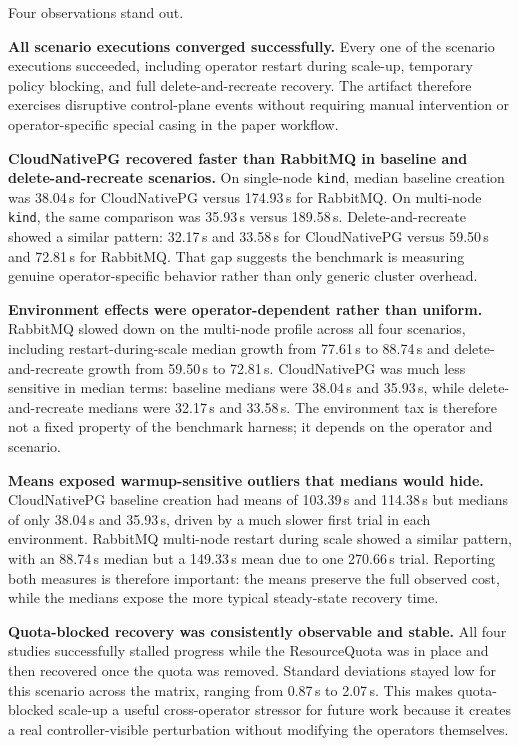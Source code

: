\documentclass[sigconf,screen]{acmart}
\begin{document}
Four observations stand out.

\textbf{All scenario executions converged successfully.}
Every one of the \RUPScenarioExecutions{} scenario executions succeeded,
including operator restart during scale-up, temporary policy blocking, and full
delete-and-recreate recovery. The artifact therefore exercises disruptive
control-plane events without requiring manual intervention or operator-specific
special casing in the paper workflow.

\textbf{CloudNativePG recovered faster than RabbitMQ in baseline and
delete-and-recreate scenarios.}
On single-node \texttt{kind}, median baseline creation was 38.04\,s for
CloudNativePG versus 174.93\,s for RabbitMQ. On multi-node \texttt{kind}, the
same comparison was 35.93\,s versus 189.58\,s. Delete-and-recreate showed a
similar pattern: 32.17\,s and 33.58\,s for CloudNativePG versus 59.50\,s and
72.81\,s for RabbitMQ. That gap suggests the benchmark is measuring genuine
operator-specific behavior rather than only generic cluster overhead.

\textbf{Environment effects were operator-dependent rather than uniform.}
RabbitMQ slowed down on the multi-node profile across all four scenarios,
including restart-during-scale median growth from 77.61\,s to 88.74\,s and
delete-and-recreate growth from 59.50\,s to 72.81\,s. CloudNativePG was much
less sensitive in median terms: baseline medians were 38.04\,s and 35.93\,s,
while delete-and-recreate medians were 32.17\,s and 33.58\,s. The environment
tax is therefore not a fixed property of the benchmark harness; it depends on
the operator and scenario.

\textbf{Means exposed warmup-sensitive outliers that medians would hide.}
CloudNativePG baseline creation had means of 103.39\,s and 114.38\,s but
medians of only 38.04\,s and 35.93\,s, driven by a much slower first trial in
each environment. RabbitMQ multi-node restart during scale showed a similar
pattern, with an 88.74\,s median but a 149.33\,s mean due to one 270.66\,s
trial. Reporting both measures is therefore important: the means preserve the
full observed cost, while the medians expose the more typical steady-state
recovery time.

\textbf{Quota-blocked recovery was consistently observable and stable.}
All four studies successfully stalled progress while the ResourceQuota was in
place and then recovered once the quota was removed. Standard deviations stayed
low for this scenario across the matrix, ranging from 0.87\,s to 2.07\,s. This
makes quota-blocked scale-up a useful cross-operator stressor for future work
because it creates a real controller-visible perturbation without modifying the
operators themselves.
\end{document}
